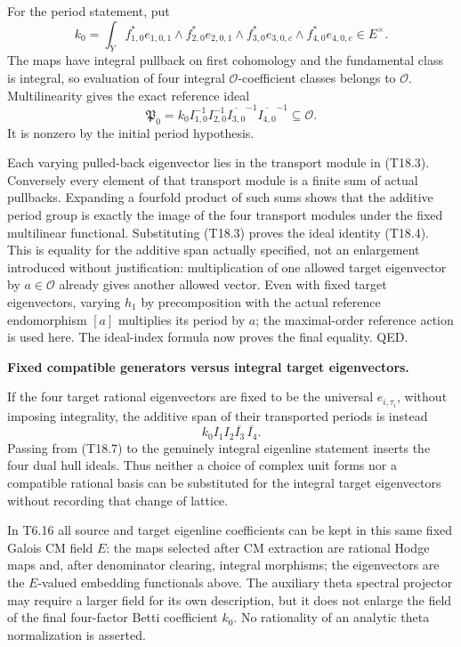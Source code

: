 \documentclass[11pt,a4paper]{article}
\theoremstyle{definition}
\begin{document}
For the period statement, put \[
k_0=\int_Y f_{1,0}^*e_{1,0,1}\wedge f_{2,0}^*e_{2,0,1}
                  \wedge f_{3,0}^*e_{3,0,c}\wedge f_{4,0}^*e_{4,0,c}
\in E^\times.
\tag{T18.5}
\] The maps have integral pullback on first cohomology and the fundamental class is integral, so evaluation of four integral \(\mathcal O\)-coefficient classes belongs to \(\mathcal O\). Multilinearity gives the exact reference ideal \[
\mathfrak P_0
=k_0 I_{1,0}^{-1}I_{2,0}^{-1}
          \overline{I_{3,0}}^{-1}\overline{I_{4,0}}^{-1}
\subseteq\mathcal O.
\tag{T18.6}
\] It is nonzero by the initial period hypothesis.

Each varying pulled-back eigenvector lies in the transport module in (T18.3). Conversely every element of that transport module is a finite sum of actual pullbacks. Expanding a fourfold product of such sums shows that the additive period group is exactly the image of the four transport modules under the fixed multilinear functional. Substituting (T18.3) proves the ideal identity (T18.4). This is equality for the additive span actually specified, not an enlargement introduced without justification: multiplication of one allowed target eigenvector by \(a\in\mathcal O\) already gives another allowed vector. Even with fixed target eigenvectors, varying \(h_1\) by precomposition with the actual reference endomorphism \([a]\) multiplies its period by \(a\); the maximal-order reference action is used here. The ideal-index formula now proves the final equality. QED.

\textbf{Fixed compatible generators versus integral target eigenvectors.}

If the four target rational eigenvectors are fixed to be the universal \(e_{i,\tau_i}\), without imposing integrality, the additive span of their transported periods is instead \[
k_0 I_1I_2\overline{I_3}\,\overline{I_4}.
\tag{T18.7}
\] Passing from (T18.7) to the genuinely integral eigenline statement inserts the four dual hull ideals. Thus neither a choice of complex unit forms nor a compatible rational basis can be substituted for the integral target eigenvectors without recording that change of lattice.

In T6.16 all source and target eigenline coefficients can be kept in this same fixed Galois CM field \(E\): the maps selected after CM extraction are rational Hodge maps and, after denominator clearing, integral morphisms; the eigenvectors are the \(E\)-valued embedding functionals above. The auxiliary theta spectral projector may require a larger field for its own description, but it does not enlarge the field of the final four-factor Betti coefficient \(k_0\). No rationality of an analytic theta normalization is asserted.
\end{document}
